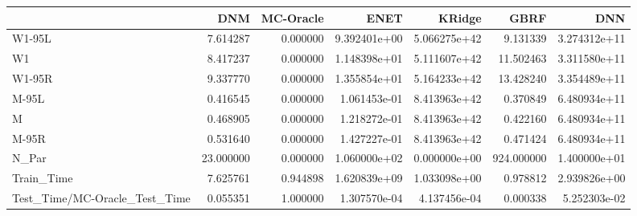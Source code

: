 \begin{tabular}{lrrrrrr}
\toprule
{} &        DNM &  MC-Oracle &          ENET &        KRidge &        GBRF &           DNN \\
\midrule
W1-95L                        &   7.614287 &   0.000000 &  9.392401e+00 &  5.066275e+42 &    9.131339 &  3.274312e+11 \\
W1                            &   8.417237 &   0.000000 &  1.148398e+01 &  5.111607e+42 &   11.502463 &  3.311580e+11 \\
W1-95R                        &   9.337770 &   0.000000 &  1.355854e+01 &  5.164233e+42 &   13.428240 &  3.354489e+11 \\
M-95L                         &   0.416545 &   0.000000 &  1.061453e-01 &  8.413963e+42 &    0.370849 &  6.480934e+11 \\
M                             &   0.468905 &   0.000000 &  1.218272e-01 &  8.413963e+42 &    0.422160 &  6.480934e+11 \\
M-95R                         &   0.531640 &   0.000000 &  1.427227e-01 &  8.413963e+42 &    0.471424 &  6.480934e+11 \\
N\_Par                         &  23.000000 &   0.000000 &  1.060000e+02 &  0.000000e+00 &  924.000000 &  1.400000e+01 \\
Train\_Time                    &   7.625761 &   0.944898 &  1.620839e+09 &  1.033098e+00 &    0.978812 &  2.939826e+00 \\
Test\_Time/MC-Oracle\_Test\_Time &   0.055351 &   1.000000 &  1.307570e-04 &  4.137456e-04 &    0.000338 &  5.252303e-02 \\
\bottomrule
\end{tabular}
